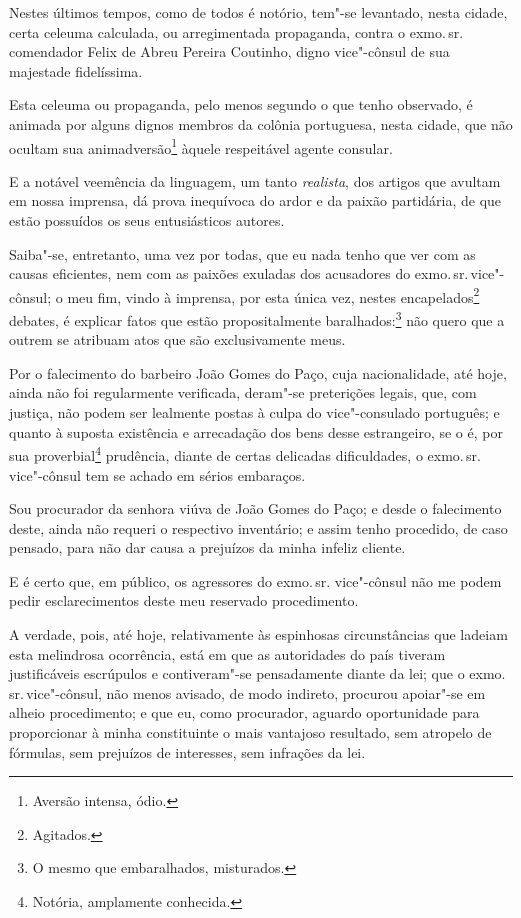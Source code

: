 Nestes últimos tempos, como de todos é notório, tem"-se levantado, nesta
cidade, certa celeuma calculada, ou arregimentada propaganda, contra o
exmo.\,sr.\,comendador Felix de Abreu Pereira Coutinho, digno vice"-cônsul
de sua majestade fidelíssima.

Esta celeuma ou propaganda, pelo menos segundo o que tenho observado, é
animada por alguns dignos membros da colônia portuguesa, nesta cidade,
que não ocultam sua animadversão\footnote{Aversão intensa, ódio.}
àquele respeitável agente consular.

E a notável veemência da linguagem, um tanto \emph{realista}, dos
artigos que avultam em nossa imprensa, dá prova inequívoca do ardor e da
paixão partidária, de que estão possuídos os seus entusiásticos autores.

Saiba"-se, entretanto, uma vez por todas, que eu nada tenho que ver com
as causas eficientes, nem com as paixões exuladas dos acusadores do
exmo.\,sr.\,vice"-cônsul; o meu fim, vindo à imprensa, por esta única vez,
nestes encapelados\footnote{Agitados.} debates, é explicar fatos que
estão propositalmente baralhados:\footnote{O mesmo que embaralhados,
  misturados.} não quero que a outrem se atribuam atos que são
exclusivamente meus.

Por o falecimento do barbeiro João Gomes do Paço, cuja nacionalidade,
até hoje, ainda não foi regularmente verificada, deram"-se preterições
legais, que, com justiça, não podem ser lealmente postas à culpa do
vice"-consulado português; e quanto à suposta existência e arrecadação
dos bens desse estrangeiro, se o é, por sua proverbial\footnote{
  Notória, amplamente conhecida.}
prudência, diante de certas
delicadas dificuldades, o exmo.\,sr.\,vice"-cônsul tem se achado em sérios
embaraços.

Sou procurador da senhora viúva de João Gomes do Paço; e desde o
falecimento deste, ainda não requeri o respectivo inventário; e assim
tenho procedido, de caso pensado, para não dar causa a prejuízos da
minha infeliz cliente.

E é certo que, em público, os agressores do exmo.\,sr. vice"-cônsul não me
podem pedir esclarecimentos deste meu reservado procedimento.

A verdade, pois, até hoje, relativamente às espinhosas circunstâncias
que ladeiam esta melindrosa ocorrência, está em que as autoridades do
país tiveram justificáveis escrúpulos e contiveram"-se pensadamente
diante da lei; que o exmo.\,sr.\,vice"-cônsul, não menos avisado, de modo
indireto, procurou apoiar"-se em alheio procedimento; e que eu, como
procurador, aguardo oportunidade para proporcionar à minha constituinte
o mais vantajoso resultado, sem atropelo de fórmulas, sem prejuízos de
interesses, sem infrações da lei.

